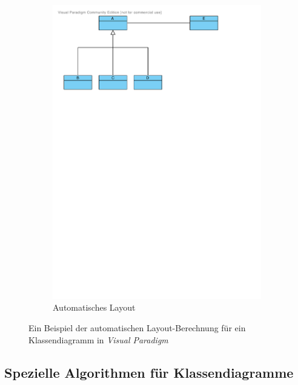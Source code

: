 \begin{figure}[hbt]
\begin{subfigure}{\rightsubfigurewidth}
        \includegraphics[scale=\graphicsscale]{resources/visual-paradigm-auto-layout-b}
        \caption{Automatisches Layout}
        \label{fig:visual-paradigm-auto-layout-b}
    \end{subfigure}
    \caption{Ein Beispiel der automatischen Layout-Berechnung für ein Klassendiagramm in \textit{Visual Paradigm}}
    \label{fig:visual-paradigm-auto-layout}
\end{figure}

\subsection{Spezielle Algorithmen für Klassendiagramme}
\label{subsec:special-algorithms-for-class-diagrams}

